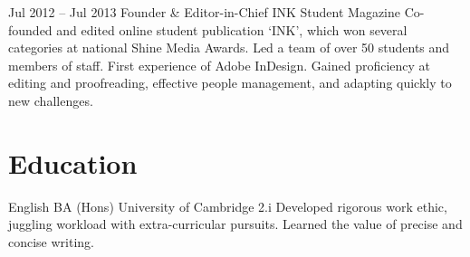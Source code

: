 \documentclass[DIV=15,color=blue!60!green!90]{komacv}
\begin{document}

  \cventry
  {Jul 2012 -- Jul 2013}
  {Founder \& Editor-in-Chief}
  {INK Student Magazine}
  {}
  {}
  {Co-founded and edited online student publication `INK', which won several
  categories at national Shine Media Awards. Led a team of over 50 students and
  members of staff. First experience of Adobe InDesign. Gained proficiency at
  editing and proofreading, effective people management, and adapting quickly to
  new challenges.}


  \section{Education}

  {English BA (Hons)}
  {University of Cambridge}
  {}
  {2.i}
  {Developed rigorous work ethic, juggling workload with extra-curricular
  pursuits. Learned the value of precise and concise writing.}

\end{document}
